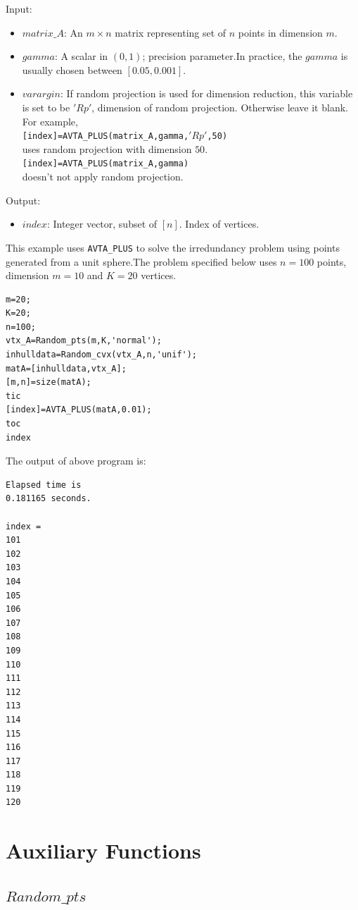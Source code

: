 \documentclass[a4paper,12pt]{article}
\begin{document}
\noindent Input:
\begin{itemize}
	\item {$matrix\_A$:}
	An $m \times n$ matrix representing set of $n$ points in dimension $m$.
	\item {$gamma$:}
	A scalar in $(0,1)$; precision parameter.In practice, the $gamma$ is usually chosen between $[0.05,0.001]$. 
	\item {$varargin$:}
	 If random projection is used for dimension reduction, this variable is set to be  $'Rp'$, dimension of random projection. Otherwise leave it blank. For example,\\ \texttt{[index]=AVTA\_PLUS(matrix\_A,gamma,$'Rp'$,50)} \\
	 uses random projection with dimension $50$. \\
	 \texttt{[index]=AVTA\_PLUS(matrix\_A,gamma)}\\
	 doesn't not apply random projection.
	 
\end{itemize}
Output:
\begin{itemize}
	\item {$index$:}
	Integer vector, subset of  $[n]$. Index of vertices. 
\end{itemize}


This example uses \texttt{AVTA\_PLUS} to solve the irredundancy problem using points generated from a unit sphere.The problem specified below uses $n=100$ points, dimension $m=10$ and $K=20$ vertices.
\begin{verbatim}
m=20;
K=20;
n=100;
vtx_A=Random_pts(m,K,'normal');
inhulldata=Random_cvx(vtx_A,n,'unif');
matA=[inhulldata,vtx_A];
[m,n]=size(matA);
tic
[index]=AVTA_PLUS(matA,0.01);
toc
index
\end{verbatim}
The output of above program is:\\

\begin{verbatim}
Elapsed time is 
0.181165 seconds.

index =
101
102
103
104
105
106
107
108
109
110
111
112
113
114
115
116
117
118
119
120
\end{verbatim}



\section{Auxiliary Functions}

\subsection{$Random\_pts$}
\end{document}
